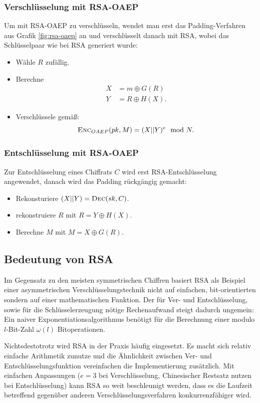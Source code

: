 \subsubsection{Verschlüsselung mit RSA-OAEP}
Um mit RSA-OAEP zu verschlüsseln, wendet man erst das Padding-Verfahren
aus Grafik \ref{fig:rsa-oaep} an und verschlüsselt danach mit RSA, wobei
das Schlüsselpaar wie bei RSA generiert wurde:
\begin{itemize}
\item Wähle $R$ zufällig.
\item Berechne
\begin{align*}
  X & = m \oplus G(R) \\
  Y & = R \oplus H(X).
\end{align*}
\item Verschlüssele gemäß:
\[
  \textsc{Enc}_{OAEP}(pk, M) = (X||Y)^e \mod N.
\]
\end{itemize}
\subsubsection{Entschlüsselung mit RSA-OAEP}
Zur Entschlüsselung eines Chiffrats $C$ wird erst RSA-Entschlüsselung
angewendet, danach wird das Padding rückgängig gemacht:
\begin{itemize}
\item Rekonsturiere $(X||Y) = \textsc{Dec}(sk, C)$.
\item rekonstruiere $R$ mit $R = Y \oplus H(X)$.
\item Berechne $M$ mit $M = X \oplus G(R)$.
\end{itemize}

\subsection{Bedeutung von RSA}
Im Gegensatz zu den meisten symmetrischen Chiffren basiert RSA als
Beispiel einer asymmetrischen Verschlüsselungstechnik nicht auf
einfachen, bit-orientierten sondern auf einer mathematischen
Funktion. Der für Ver- und Entschlüsselung, sowie für die
Schlüsselerzeugung nötige Rechenaufwand steigt dadurch ungemein: Ein
naiver Exponentiationsalgorithmus benötigt für die Berechnung einer
modulo $l$-Bit-Zahl $\omega(l)$ Bitoperationen. %

Nichtsdestotrotz wird RSA in der Praxis häufig eingesetzt. Es macht sich
relativ einfache Arithmetik zunutze und die Ähnlichkeit zwischen Ver-
und Entschlüsselungsfunktion vereinfachen die Implementierung
zusätzlich. Mit einfachen Anpassungen ($e = 3$ bei Verschlüsselung,
Chinesischer Restsatz nutzen bei Entschlüsselung) kann RSA so weit
beschleunigt werden, dass es die Laufzeit betreffend gegenüber anderen
Verschlüsselungsverfahren konkurrenzfähiger wird.

